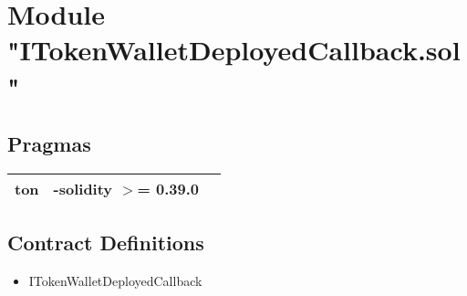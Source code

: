 
\section{Module "ITokenWalletDeployedCallback.sol"}


\subsection{Pragmas}


\noindent\begin{tabular}{|l|l|p{5cm}|}\hline
ton & -solidity $>$= 0.39.0 &\\\hline
\end{tabular}


\subsection{Contract Definitions}

\begin{itemize}
\item ITokenWalletDeployedCallback
\end{itemize}
